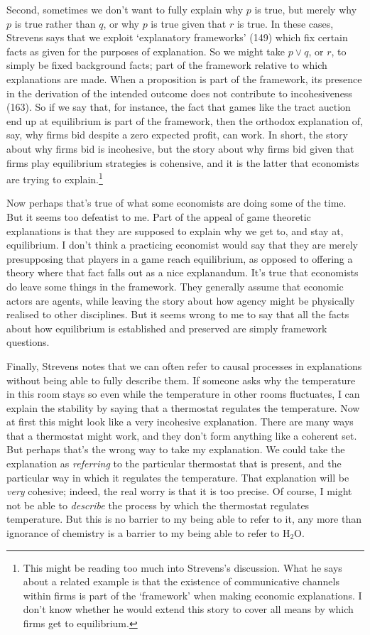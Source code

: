 Second, sometimes we don't want to fully explain why $p$ is true, but merely why $p$ is true rather than $q$, or why $p$ is true given that $r$ is true. In these cases, Strevens says that we exploit `explanatory frameworks' (149) which fix certain facts as given for the purposes of explanation. So we might take $p \vee q$, or $r$, to simply be fixed background facts; part of the framework relative to which explanations are made. When a proposition is part of the framework, its presence in the derivation of the intended outcome does not contribute to incohesiveness (163). So if we say that, for instance, the fact that games like the tract auction end up at equilibrium is part of the framework, then the orthodox explanation of, say, why firms bid despite a zero expected profit, can work. In short, the story about why firms bid is incohesive, but the story about why firms bid given that firms play equilibrium strategies is cohensive, and it is the latter that economists are trying to explain.\footnote{This might be reading too much into Strevens's discussion. What he says about a related example is that the existence of communicative channels within firms is part of the `framework' when making economic explanations. I don't know whether he would extend this story to cover all means by which firms get to equilibrium.}

Now perhaps that's true of what some economists are doing some of the time. But it seems too defeatist to me. Part of the appeal of game theoretic explanations is that they are supposed to explain why we get to, and stay at, equilibrium. I don't think a practicing economist would say that they are merely presupposing that players in a game reach equilibrium, as opposed to offering a theory where that fact falls out as a nice explanandum. It's true that economists do leave some things in the framework. They generally assume that economic actors are agents, while leaving the story about how agency might be physically realised to other disciplines. But it seems wrong to me to say that all the facts about how equilibrium is established and preserved are simply framework questions.

Finally, Strevens notes that we can often refer to causal processes in explanations without being able to fully describe them. If someone asks why the temperature in this room stays so even while the temperature in other rooms fluctuates, I can explain the stability by saying that a thermostat regulates the temperature. Now at first this might look like a very incohesive explanation. There are many ways that a thermostat might work, and they don't form anything like a coherent set. But perhaps that's the wrong way to take my explanation. We could take the explanation as \textit{referring} to the particular thermostat that is present, and the particular way in which it regulates the temperature. That explanation will be \textit{very} cohesive; indeed, the real worry is that it is too precise. Of course, I might not be able to \textit{describe} the process by which the thermostat regulates temperature. But this is no barrier to my being able to refer to it, any more than ignorance of chemistry is a barrier to my being able to refer to H$_2$O.

